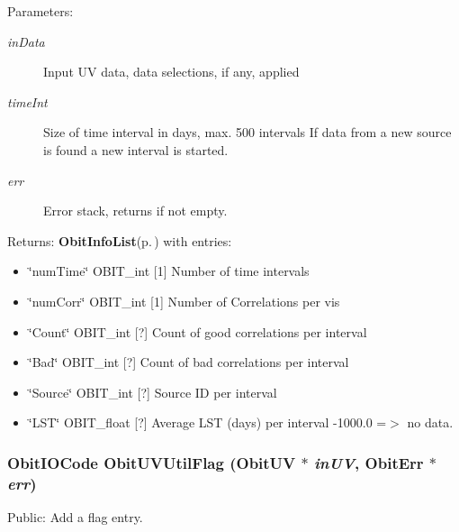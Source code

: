 \begin{Desc}
\item[Parameters:]
\begin{description}
\item[{\em in\-Data}]Input UV data, data selections, if any, applied \item[{\em time\-Int}]Size of time interval in days, max. 500 intervals If data from a new source is found a new interval is started. \item[{\em err}]Error stack, returns if not empty. \end{description}
\end{Desc}
\begin{Desc}
\item[Returns:]{\bf Obit\-Info\-List}{\rm (p.\,\pageref{structObitInfoList})} with entries: \begin{itemize}
\item \char`\"{}num\-Time\char`\"{} OBIT\_\-int [1] Number of time intervals \item \char`\"{}num\-Corr\char`\"{} OBIT\_\-int [1] Number of Correlations per vis \item \char`\"{}Count\char`\"{} OBIT\_\-int [?] Count of good correlations per interval \item \char`\"{}Bad\char`\"{} OBIT\_\-int [?] Count of bad correlations per interval \item \char`\"{}Source\char`\"{} OBIT\_\-int [?] Source ID per interval \item \char`\"{}LST\char`\"{} OBIT\_\-float [?] Average LST (days) per interval -1000.0 =$>$ no data. \end{itemize}
\end{Desc}
\subsubsection{\setlength{\rightskip}{0pt plus 5cm}Obit\-IOCode Obit\-UVUtil\-Flag ({\bf Obit\-UV} $\ast$ {\em in\-UV}, {\bf Obit\-Err} $\ast$ {\em err})}\label{ObitUVUtil_8c_a17}


Public: Add a flag entry. 

